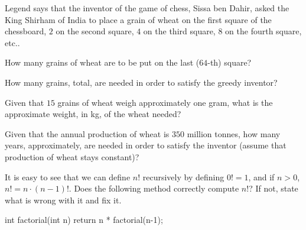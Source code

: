 \begin{pro}
Legend says that the inventor of the game of chess, Sissa ben Dahir,  asked the King Shirham of India
to place a grain of wheat on the first square of the
chessboard, $2$ on the second square, $4$ on the third square, $8$
on the fourth square, etc..
\begin{lenum}
\item  How many grains of wheat are to be
put on the last ($64$-th) square?
\item  How many grains, total, are
needed in order to satisfy the greedy inventor?
\item  Given that $15$
grains of wheat weigh approximately one gram, what is the
approximate weight, in kg, of the wheat needed?
\item  Given that the
annual production of wheat is $350$ million tonnes, how many years,
approximately, are needed in order to satisfy the inventor (assume
that production of wheat stays constant)?
\end{lenum}
\end{pro}




\begin{pro}
It is easy to see that we can define $n!$ recursively by defining $0!=1$, and if $n>0$,
$n!=n\cdot (n-1)!$. 
Does the following method correctly compute $n!$?  
If not, state what is wrong with it and fix it.
\begin{code}
	int factorial(int n) {
	    return n * factorial(n-1);
	}
\end{code}
\end{pro}

